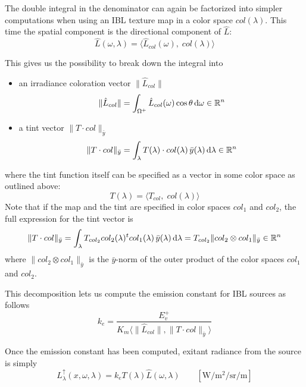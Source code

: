 The double integral in the denominator can again be factorized into simpler
computations when using an \gls{IBL} texture map in a color space $col(\lambda)$.
This time the spatial component is the directional component of $\hat{L}$:
\begin{equation}
\hat{L}(\omega, \lambda) = \big\langle \hat{L}_{col}(\omega),\; col(\lambda) \big\rangle
\end{equation}

This gives us the possibility to break down the integral into
\begin{itemize}
\item an irradiance coloration vector $\|\hat{L}_{col}\|$
\begin{equation}
\|\hat{L}_{col}\| = \int_{\Omega^+} \hat{L}_{col}(\omega)\cos\theta \mathop{}\!\mathrm{d}\omega \in \mathbb{R}^n
\end{equation}
\item a tint vector $\|T \cdot col\|_{\bar y}$
\begin{equation}
\|T \cdot col\|_{\bar y} = \int_\lambda T(\lambda)\cdot col(\lambda)\,\bar y(\lambda) \mathop{}\!\mathrm{d}\lambda \in \mathbb{R}^n
\end{equation}
\end{itemize}
where the tint function itself can be specified as a vector in some color space
as outlined above:
\begin{equation}
T(\lambda) = \langle T_{col},\; col(\lambda)\rangle
\end{equation}
Note that if the map and the tint are specified in color spaces $col_1$ and
$col_2$, the full expression for the tint vector is
\begin{equation}
\|T \cdot col\|_{\bar y} = \int_\lambda T_{col_2}col_2(\lambda)^t col_1(\lambda)\,\bar y(\lambda) \mathop{}\!\mathrm{d}\lambda
 = T_{col_2} \|col_2 \otimes col_1\|_{\bar y}
 \in \mathbb{R}^n
\end{equation}
where $\|col_2 \otimes col_1\|_{\bar y}$ is the $\bar y$-norm of the outer
product of the color spaces $col_1$ and $col_2$.

This decomposition lets us compute the emission constant for \gls{IBL} sources
as follows
\begin{equation}
k_e = \frac{E^+_v} {K_m \langle \|\hat{L}_{col}\|, \|T \cdot col\|_{\bar y}
\rangle}
\end{equation}

Once the emission constant has been computed, exitant radiance from the source
is simply
\begin{equation}
L^\uparrow_{\lambda}(x, \omega, \lambda) = k_e  T(\lambda)
\hat{L}(\omega,\lambda)
\qquad \left[\si{\watt\per\square\meter\per\steradian\per\meter}\right]
\end{equation}

